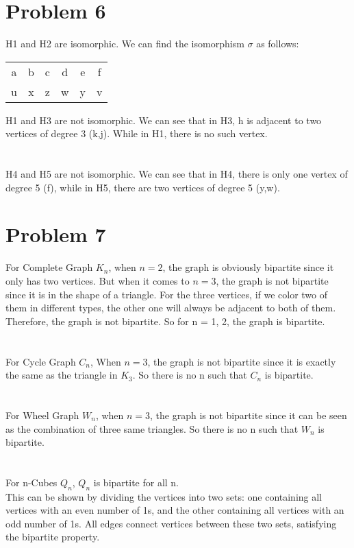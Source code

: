 \documentclass{article}
\begin{document}
\section{Problem 6}
H1 and H2 are isomorphic. We can find the isomorphism $\sigma$ as follows:\\
\begin{table}[H]
\centering
\begin{tabular}{|c|c|c|c|c|c|}
\hline
a & b & c & d & e & f\\
u & x & z & w & y & v\\
\hline
\end{tabular}
\end{table}
H1 and H3 are not isomorphic. We can see that in H3, h is adjacent to two vertices of degree 3 (k,j). While in H1, there is no such vertex.\\
\\ \hspace*{\fill} \\
H4 and H5 are not isomorphic. We can see that in H4, there is only one vertex of degree 5 (f), while in H5, there are two vertices of degree 5 (y,w).\\
\section{Problem 7}
For Complete Graph $K_n$, when $n = 2$, the graph is obviously bipartite since it only has two vertices. But when it comes to $n = 3$, the graph is not bipartite since it is in the shape of a triangle. For the three vertices, if we color two of them in different types, the other one will always be adjacent to both of them. Therefore, the graph is not bipartite. So for n = 1, 2, the graph is bipartite.\\
\\ \hspace*{\fill} \\
For Cycle Graph $C_n$, When $n = 3$, the graph is not bipartite since it is exactly the same as the triangle in $K_3$. So there is no n such that $C_n$ is bipartite.\\
\\ \hspace*{\fill} \\
For Wheel Graph $W_n$, when $n = 3$, the graph is not bipartite since it can be seen as the combination of three same triangles. So there is no n such that $W_n$ is bipartite.\\
\\ \hspace*{\fill} \\
For n-Cubes $Q_n$, $Q_n$ is bipartite for all n.\\
This can be shown by dividing the vertices into two sets: one containing all vertices with an even number of 1s, and the other containing all vertices with an odd number of 1s. All edges connect vertices between these two sets, satisfying the bipartite property.
\end{document}
